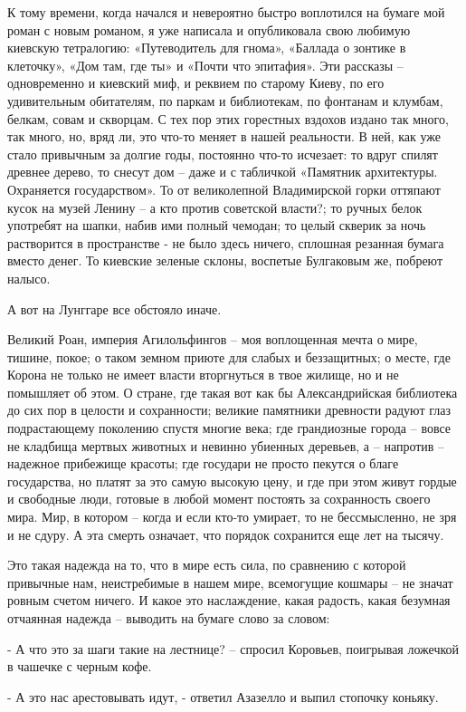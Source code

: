 К тому времени, когда начался и невероятно быстро воплотился на бумаге мой
роман с новым романом, я уже написала и опубликовала свою любимую киевскую
тетралогию: «Путеводитель для гнома», «Баллада о зонтике в клеточку», «Дом там,
где ты» и «Почти что эпитафия». Эти рассказы – одновременно и киевский миф, и
реквием по старому Киеву, по его удивительным обитателям, по паркам и
библиотекам, по фонтанам и клумбам, белкам, совам и скворцам. С тех пор этих
горестных вздохов издано так много, так много, но, вряд ли, это что-то меняет в
нашей реальности. В ней, как уже стало привычным за долгие годы, постоянно
что-то исчезает: то вдруг спилят древнее дерево, то снесут дом – даже и с
табличкой «Памятник архитектуры. Охраняется государством». То от великолепной
Владимирской горки оттяпают кусок на музей Ленину – а кто против советской
власти?; то ручных белок употребят на шапки, набив ими полный чемодан; то целый
скверик за ночь растворится в пространстве - не было здесь ничего, сплошная
резанная бумага вместо денег. То киевские зеленые склоны, воспетые Булгаковым
же, побреют налысо.

А вот на Лунггаре все обстояло иначе.

Великий Роан, империя Агилольфингов – моя воплощенная мечта о мире, тишине,
покое; о таком земном приюте для слабых и беззащитных; о месте, где Корона не
только не имеет власти вторгнуться в твое жилище, но и не помышляет об этом. О
стране, где такая вот как бы Александрийская библиотека до сих пор в целости и
сохранности; великие памятники древности радуют глаз подрастающему поколению
спустя многие века; где грандиозные города – вовсе не кладбища мертвых животных
и невинно убиенных деревьев, а – напротив – надежное прибежище красоты; где
государи не просто пекутся о благе государства, но платят за это самую высокую
цену, и где при этом живут гордые и свободные люди, готовые в любой момент
постоять за сохранность своего мира. Мир, в котором – когда и если кто-то
умирает, то не бессмысленно, не зря и не сдуру. А эта смерть означает, что
порядок сохранится еще лет на тысячу.

Это такая надежда на то, что в мире есть сила, по сравнению с которой привычные
нам, неистребимые в нашем мире, всемогущие кошмары – не значат ровным счетом
ничего. И какое это наслаждение, какая радость, какая безумная отчаянная
надежда – выводить на бумаге слово за словом:

- А что это за шаги такие на лестнице? – спросил Коровьев, поигрывая ложечкой в
чашечке с черным кофе.

- А это нас арестовывать идут, - ответил Азазелло и выпил стопочку коньяку.

